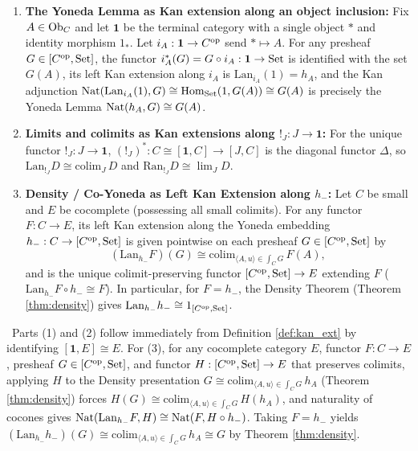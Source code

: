 \documentclass[10pt,a4paper]{article}
\begin{document}
\begin{theorem}\label{thm:kan_unification}
\begin{enumerate}
\item \textbf{The Yoneda Lemma as Kan extension along an object inclusion:} Fix $A \in {\textrm{Ob}}_C$ and let $\mathbf{1}$ be the terminal category with a single object $*$ and identity morphism $1_*$. Let $i_A : \mathbf{1} \to C^{\textrm{op}}$ send $* \mapsto A$. For any presheaf $G \in [C^{\textrm{op}}, {\textrm{Set}}]$, the functor $i_A^*(G) = G \circ i_A : \mathbf{1} \to {\textrm{Set}}$ is identified with the set $G(A)$, its left Kan extension along $i_A$ is $\mathrm{Lan}_{i_A}(1) = h_A$, and the Kan adjunction ${\textrm{Nat}}(\mathrm{Lan}_{i_A}(1), G) \cong {\textrm{Hom}}_{\textrm{Set}}(1, G(A)) \cong G(A)$ is precisely the Yoneda Lemma ${\textrm{Nat}}(h_A, G) \cong G(A)$.
\item \textbf{Limits and colimits as Kan extensions along $!_J : J \to \mathbf{1}$:} For the unique functor $!_J : J \to \mathbf{1}$, $(!_J)^* : C \cong [\mathbf{1}, C] \to [J, C]$ is the diagonal functor $\Delta$, so $\mathrm{Lan}_{!_J} D \cong \mathrm{colim}_J\, D$ and $\mathrm{Ran}_{!_J} D \cong \lim_J D$.
\item \textbf{Density / Co-Yoneda as Left Kan Extension along $h_-$:} Let $C$ be small and $E$ be cocomplete (possessing all small colimits). For any functor $F : C \to E$, its left Kan extension along the Yoneda embedding $h_- : C \to [C^{\textrm{op}}, {\textrm{Set}}]$ is given pointwise on each presheaf $G \in [C^{\textrm{op}}, {\textrm{Set}}]$ by
$$\left(\mathrm{Lan}_{h_-} F\right)(G) \cong \mathrm{colim}_{\langle A, u \rangle \in \int_C G}\, F(A),$$
and is the unique colimit-preserving functor $[C^{\textrm{op}}, {\textrm{Set}}] \to E$ extending $F$ ($\mathrm{Lan}_{h_-} F \circ h_- \cong F$). In particular, for $F = h_-$, the Density Theorem (Theorem \ref{thm:density}) gives $\mathrm{Lan}_{h_-} h_- \cong 1_{[C^{\textrm{op}}, {\textrm{Set}}]}$.
\end{enumerate}
\end{theorem}
\myprf\ Parts (1) and (2) follow immediately from Definition \ref{def:kan_ext} by identifying $[\mathbf{1}, E] \cong E$. For (3), for any cocomplete category $E$, functor $F : C \to E$, presheaf $G \in [C^{\textrm{op}}, {\textrm{Set}}]$, and functor $H : [C^{\textrm{op}}, {\textrm{Set}}] \to E$ that preserves colimits, applying $H$ to the Density presentation $G \cong \mathrm{colim}_{\langle A, u \rangle \in \int_C G}\, h_A$ (Theorem \ref{thm:density}) forces $H(G) \cong \mathrm{colim}_{\langle A, u \rangle \in \int_C G}\, H(h_A)$, and naturality of cocones gives ${\textrm{Nat}}(\mathrm{Lan}_{h_-} F, H) \cong {\textrm{Nat}}(F, H \circ h_-)$. Taking $F = h_-$ yields $(\mathrm{Lan}_{h_-} h_-)(G) \cong \mathrm{colim}_{\langle A, u \rangle \in \int_C G}\, h_A \cong G$ by Theorem \ref{thm:density}. \myqed
\end{document}
